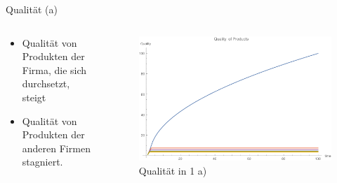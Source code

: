 \documentclass[xcolor={dvipsnames},10pt]{beamer}
\begin{document}
\begin{frame}{Qualität (a)}
\begin{columns}[T]
    \begin{column}{.3\textwidth}
      \begin{itemize}
      \item Qualität von Produkten der Firma, die sich durchsetzt, steigt
      \item Qualität von Produkten der anderen Firmen stagniert. 
      \end{itemize}
      \end{column}
      \begin{column}{.7\textwidth}
      \begin{figure}[t]
            \centering
            \includegraphics[scale=0.35]{../Plots/quality1a}
            \caption{Qualität in 1 a)}
            \label{fig:quality1a}
       \end{figure}
    \end{column}
  \end{columns}
\end{frame}
\end{document}
